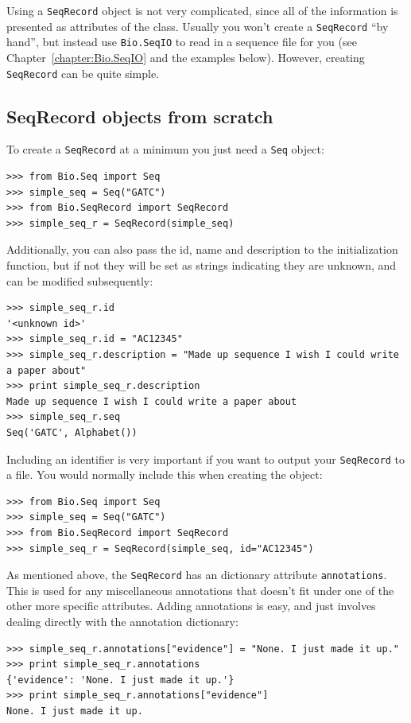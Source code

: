 \documentclass{report}
\begin{document}
Using a \verb|SeqRecord| object is not very complicated, since all of the
information is presented as attributes of the class. Usually you won't create
a \verb|SeqRecord| ``by hand'', but instead use \verb|Bio.SeqIO| to read in a
sequence file for you (see Chapter~\ref{chapter:Bio.SeqIO} and the examples
below).  However, creating \verb|SeqRecord| can be quite simple.

\subsection{SeqRecord objects from scratch}

To create a \verb|SeqRecord| at a minimum you just need a \verb|Seq| object:

\begin{verbatim}
>>> from Bio.Seq import Seq
>>> simple_seq = Seq("GATC")
>>> from Bio.SeqRecord import SeqRecord
>>> simple_seq_r = SeqRecord(simple_seq)
\end{verbatim}

Additionally, you can also pass the id, name and description to the initialization function, but if not they will be set as strings indicating they are unknown, and can be modified subsequently:

\begin{verbatim}
>>> simple_seq_r.id
'<unknown id>'
>>> simple_seq_r.id = "AC12345"
>>> simple_seq_r.description = "Made up sequence I wish I could write a paper about"
>>> print simple_seq_r.description
Made up sequence I wish I could write a paper about
>>> simple_seq_r.seq
Seq('GATC', Alphabet())
\end{verbatim}

Including an identifier is very important if you want to output your \verb|SeqRecord| to a file.  You would normally include this when creating the object:

\begin{verbatim}
>>> from Bio.Seq import Seq
>>> simple_seq = Seq("GATC")
>>> from Bio.SeqRecord import SeqRecord
>>> simple_seq_r = SeqRecord(simple_seq, id="AC12345")
\end{verbatim}

As mentioned above, the \verb|SeqRecord| has an dictionary attribute \verb|annotations|. This is used
for any miscellaneous annotations that doesn't fit under one of the other more specific attributes.
Adding annotations is easy, and just involves dealing directly with the annotation dictionary:

\begin{verbatim}
>>> simple_seq_r.annotations["evidence"] = "None. I just made it up."
>>> print simple_seq_r.annotations
{'evidence': 'None. I just made it up.'}
>>> print simple_seq_r.annotations["evidence"]
None. I just made it up.
\end{verbatim}
\end{document}
